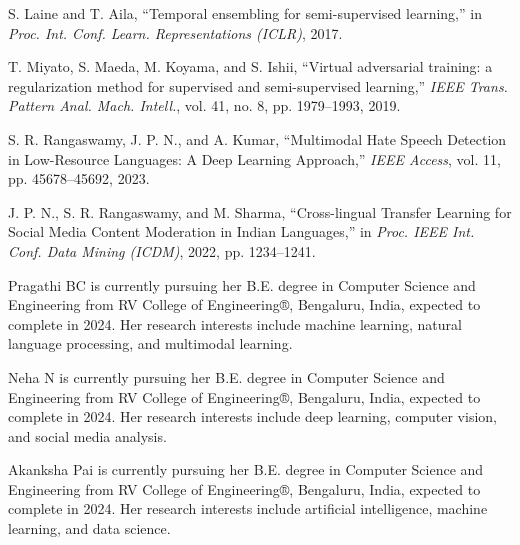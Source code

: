 \documentclass{ieeeaccess}
\begin{document}
\begin{thebibliography}{00}
 S. Laine and T. Aila, ``Temporal ensembling for semi-supervised learning,'' in \emph{Proc. Int. Conf. Learn. Representations (ICLR)}, 2017.

 T. Miyato, S. Maeda, M. Koyama, and S. Ishii, ``Virtual adversarial training: a regularization method for supervised and semi-supervised learning,'' \emph{IEEE Trans. Pattern Anal. Mach. Intell.}, vol. 41, no. 8, pp. 1979--1993, 2019.

 S. R. Rangaswamy, J. P. N., and A. Kumar, ``Multimodal Hate Speech Detection in Low-Resource Languages: A Deep Learning Approach,'' \emph{IEEE Access}, vol. 11, pp. 45678--45692, 2023.

 J. P. N., S. R. Rangaswamy, and M. Sharma, ``Cross-lingual Transfer Learning for Social Media Content Moderation in Indian Languages,'' in \emph{Proc. IEEE Int. Conf. Data Mining (ICDM)}, 2022, pp. 1234--1241.

\end{thebibliography}

\vspace{0.5cm}
\setlength{\parskip}{0pt}
\begin{IEEEbiography}{Pragathi BC} is currently pursuing her B.E. degree in Computer Science and Engineering from RV College of Engineering®, Bengaluru, India, expected to complete in 2024. Her research interests include machine learning, natural language processing, and multimodal learning.
\end{IEEEbiography}

\vspace{-2.5cm}
\begin{IEEEbiography}{Neha N} is currently pursuing her B.E. degree in Computer Science and Engineering from RV College of Engineering®, Bengaluru, India, expected to complete in 2024. Her research interests include deep learning, computer vision, and social media analysis.
\end{IEEEbiography}

\vspace{-2.5cm}
\begin{IEEEbiography}{Akanksha Pai} is currently pursuing her B.E. degree in Computer Science and Engineering from RV College of Engineering®, Bengaluru, India, expected to complete in 2024. Her research interests include artificial intelligence, machine learning, and data science.
\end{IEEEbiography}
\end{document}
